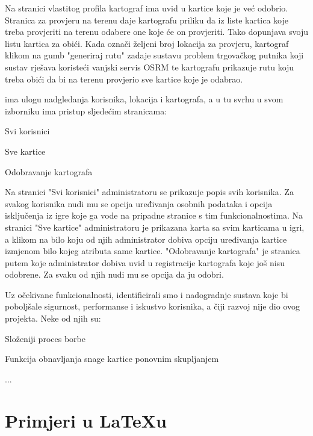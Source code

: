 		Na stranici vlastitog profila kartograf ima uvid u kartice koje je već odobrio. Stranica za provjeru na terenu daje kartografu priliku da iz liste kartica koje treba provjeriti na terenu odabere one koje će on provjeriti. Tako dopunjava svoju listu kartica za obići. Kada označi željeni broj lokacija za provjeru, kartograf klikom na gumb "generiraj rutu" zadaje sustavu problem trgovačkog putnika koji sustav rješava koristeći vanjski servis OSRM te kartografu prikazuje rutu koju treba obići da bi na terenu provjerio sve kartice koje je odabrao.
		
		 ima ulogu nadgledanja korisnika, lokacija i kartografa, a u tu svrhu u svom izborniku ima pristup sljedećim stranicama:
		
		\begin{packed_item}
		    \item Svi korisnici
		    \item Sve kartice
		    \item Odobravanje kartografa
		\end{packed_item}
		
		Na stranici "Svi korisnici" administratoru se prikazuje popis svih korisnika. Za svakog korisnika nudi mu se opcija uređivanja osobnih podataka i opcija isključenja iz igre koje ga vode na pripadne stranice s tim funkcionalnostima. Na stranici "Sve kartice" administratoru je prikazana karta sa svim karticama u igri, a klikom na bilo koju od njih administrator dobiva opciju uređivanja kartice izmjenom bilo kojeg atributa same kartice. "Odobravanje kartografa" je stranica putem koje administrator dobiva uvid u registracije kartografa koje još nisu odobrene. Za svaku od njih nudi mu se opcija da ju odobri.
		
		Uz očekivane funkcionalnosti, identificirali smo i nadogradnje sustava koje bi poboljšale sigurnost, performanse i iskustvo korisnika, a čiji razvoj nije dio ovog projekta. Neke od njih su:
		
		\begin{packed_item}
		    \item Složeniji proces borbe
		    \item Funkcija obnavljanja snage kartice ponovnim skupljanjem
		    \item ...
		\end{packed_item}
		
		\section{Primjeri u \LaTeX u}
		
